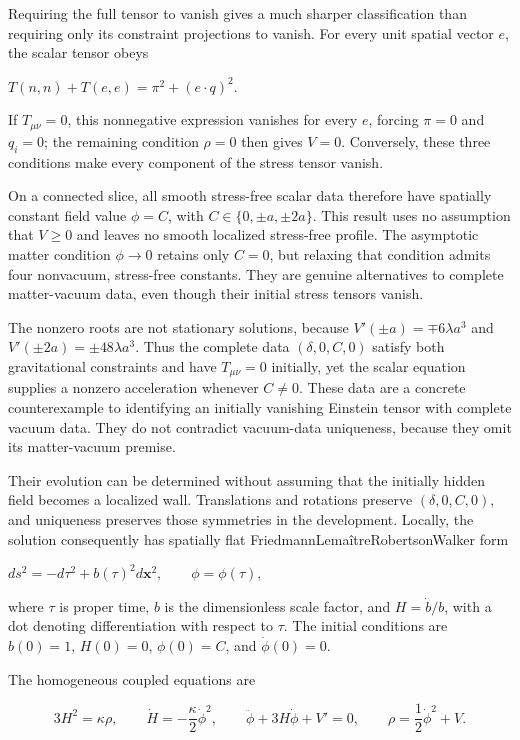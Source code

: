 \documentclass[11pt]{article}
\begin{document}
Requiring the full tensor to vanish gives a much sharper classification than requiring only its constraint projections to vanish. For every unit spatial vector $e$, the scalar tensor obeys

$T(n,n)+T(e,e)=\pi^2+(e\cdot q)^2.$

If $T_{\mu\nu}=0$, this nonnegative expression vanishes for every $e$, forcing $\pi=0$ and $q_i=0$; the remaining condition $\rho=0$ then gives $V=0$. Conversely, these three conditions make every component of the stress tensor vanish.

On a connected slice, all smooth stress-free scalar data therefore have spatially constant field value $\phi=C$, with $C\in\{0,\pm a,\pm2a\}$. This result uses no assumption that $V\geq0$ and leaves no smooth localized stress-free profile. The asymptotic matter condition $\phi\to0$ retains only $C=0$, but relaxing that condition admits four nonvacuum, stress-free constants. They are genuine alternatives to complete matter-vacuum data, even though their initial stress tensors vanish.

The nonzero roots are not stationary solutions, because $V'(\pm a)=\mp6\lambda a^3$ and $V'(\pm2a)=\pm48\lambda a^3$. Thus the complete data $(\delta,0,C,0)$ satisfy both gravitational constraints and have $T_{\mu\nu}=0$ initially, yet the scalar equation supplies a nonzero acceleration whenever $C\ne0$. These data are a concrete counterexample to identifying an initially vanishing Einstein tensor with complete vacuum data. They do not contradict vacuum-data uniqueness, because they omit its matter-vacuum premise.

Their evolution can be determined without assuming that the initially hidden field becomes a localized wall. Translations and rotations preserve $(\delta,0,C,0)$, and uniqueness preserves those symmetries in the development. Locally, the solution consequently has spatially flat Friedmann\textendash{}\allowbreak{}Lemaître\textendash{}\allowbreak{}Robertson\textendash{}\allowbreak{}Walker form

$ds^2=-d\tau^2+b(\tau)^2d\mathbf{x}^2,\qquad \phi=\phi(\tau),$

where $\tau$ is proper time, $b$ is the dimensionless scale factor, and $H=\dot b/b$, with a dot denoting differentiation with respect to $\tau$. The initial conditions are $b(0)=1$, $H(0)=0$, $\phi(0)=C$, and $\dot\phi(0)=0$.

The homogeneous coupled equations are

\[3H^2=\kappa\rho,\qquad \dot H=-\frac{\kappa}{2}\dot\phi^2,\qquad \ddot\phi+3H\dot\phi+V'=0,\qquad \rho=\frac12\dot\phi^2+V.\]
\end{document}
